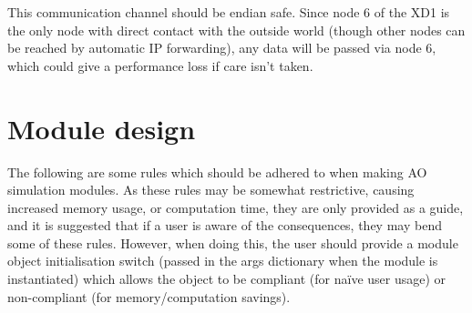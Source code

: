 \documentclass{article}
\begin{document}
This communication channel should be endian safe.  Since node 6 of the
XD1 is the only node with direct contact with the outside world
(though other nodes can be reached by automatic IP forwarding), any
data will be passed via node 6, which could give a performance loss if
care isn't taken.

\section{Module design}
The following are some rules which should be adhered to when making AO
simulation modules.  As these rules may be somewhat restrictive,
causing increased memory usage, or computation time, they are only
provided as a guide, and it is suggested that if a user is aware of
the consequences, they may bend some of these rules.  However, when
doing this, the user should provide a module object initialisation
switch (passed in the args dictionary when the module is instantiated)
which allows the object to be compliant (for naïve user usage) or
non-compliant (for memory/computation savings).
\end{document}
